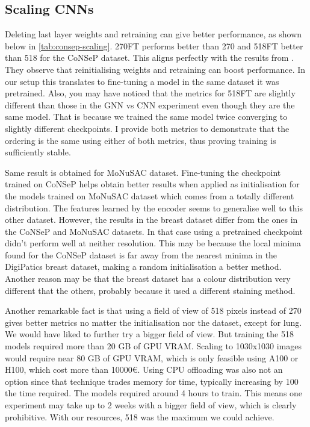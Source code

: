 \newpage
\subsection{Scaling CNNs}

Deleting last layer weights and retraining can give better performance, as shown below in \autoref{tab:consep-scaling}. 270FT performs better than 270 and 518FT better than 518 for the CoNSeP dataset. This aligns perfectly with the results from \cite{zhou2022fortuitous}. They observe that reinitialising weights and retraining can boost performance. In our setup this translates to fine-tuning a model in the same dataset it was pretrained. Also, you may have noticed that the metrics for 518FT are slightly different than those in the GNN vs CNN experiment even though they are the same model. That is because we trained the same model twice converging to slightly different checkpoints. I provide both metrics to demonstrate that the ordering is the same using either of both metrics, thus proving training is sufficiently stable.

Same result is obtained for MoNuSAC dataset. Fine-tuning the checkpoint trained on CoNSeP helps obtain better results when applied as initialisation for the models trained on MoNuSAC dataset which comes from a totally different distribution. The features learned by the encoder seems to generalise well to this other dataset. However, the results in the breast dataset differ from the ones in the CoNSeP and MoNuSAC datasets. In that case using a pretrained checkpoint didn't perform well at neither resolution. This may be because the local minima found for the CoNSeP dataset is far away from the nearest minima in the DigiPatics breast dataset, making a random initialisation a better method. Another reason may be that the breast dataset has a colour distribution very different that the others, probably because it used a different staining method.

Another remarkable fact is that using a field of view of 518 pixels instead of 270 gives better metrics no matter the initialisation nor the dataset, except for lung. We would have liked to further try a bigger field of view. But training the 518 models required more than 20 GB of GPU VRAM. Scaling to 1030x1030 images would require near 80 GB of GPU VRAM, which is only feasible using A100 or H100, which cost more than 10000€. Using CPU offloading was also not an option since that technique trades memory for time, typically increasing by 100 the time required. The models required around 4 hours to train. This means one experiment may take up to 2 weeks with a bigger field of view, which is clearly prohibitive. With our resources, 518 was the maximum we could achieve.

